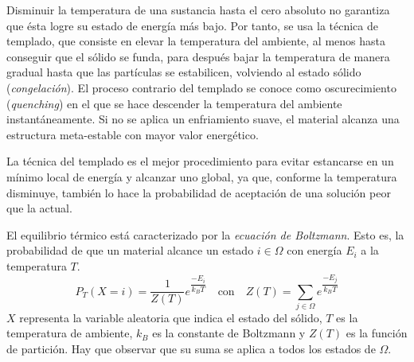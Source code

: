 Disminuir la temperatura de una sustancia hasta el cero absoluto no garantiza que ésta logre su estado de energía más bajo. Por tanto, se usa la técnica de templado, que consiste en elevar la temperatura del ambiente, al menos hasta conseguir que el sólido se funda, para después bajar la temperatura de manera gradual hasta que las partículas se estabilicen, volviendo al estado sólido (\textsl{congelación}). El proceso contrario del templado se conoce como oscurecimiento (\textsl{quenching}) en el que se hace descender la temperatura del ambiente instantáneamente. Si no se aplica un enfriamiento suave, el material
alcanza una estructura meta-estable con mayor valor energético.

La técnica del templado es el mejor procedimiento para evitar estancarse en un mínimo local de energía y alcanzar uno global, ya que, conforme la temperatura disminuye, también lo hace la probabilidad de aceptación de una solución peor que la actual.

El equilibrio térmico está caracterizado por la \textsl{ecuación de Boltzmann}. Esto es, la probabilidad de que un material alcance un estado $i \in \varOmega$ con energía $E_i$ a la temperatura $T$.
\begin{equation}
    P_T(X = i) = \frac{1}{Z(T)} e^{\dfrac{-E_i}{k_B T}} \quad \text{con} \quad Z(T) = \sum_{j \in \Omega} e^{\dfrac{-E_j}{k_B T}}
    \label{ec:4.1}
\end{equation}
$X$ representa la variable aleatoria que indica el estado del sólido, $T$ es la temperatura de ambiente, $k_B$ es la constante de Boltzmann y $Z(T)$ es la función de partición. Hay que observar que su suma se aplica a todos los estados de $\varOmega$. 

